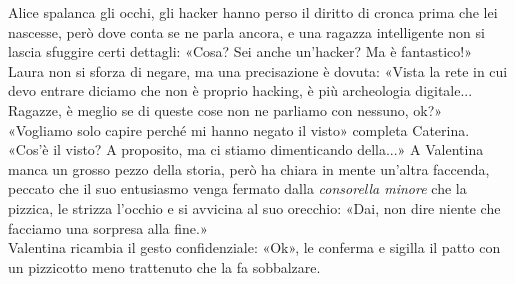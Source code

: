 \par\medskip
Alice spalanca gli occhi, gli hacker hanno perso il diritto di cronca prima che lei nascesse, per\`o dove conta se ne parla ancora, e una ragazza intelligente non si lascia sfuggire certi dettagli: «Cosa? Sei anche un'hacker? Ma \`e fantastico!»\\
Laura non si sforza di negare, ma una precisazione \`e dovuta:
«Vista la rete in cui devo entrare diciamo che non \`e proprio hacking, \`e pi\`u archeologia digitale... Ragazze, \`e meglio se di queste cose non ne parliamo con nessuno, ok?»\\
«Vogliamo solo capire perch\'e mi hanno negato il visto» completa Caterina.\\
«Cos’\`e il visto? A proposito, ma ci stiamo dimenticando della...» A Valentina manca un grosso pezzo della storia, per\`o ha chiara in mente un'altra faccenda, peccato che il suo entusiasmo venga fermato dalla \textit{consorella minore} che la pizzica, le strizza l’occhio e si avvicina al suo orecchio: «Dai, non dire niente che facciamo una sorpresa alla fine.»\\
Valentina ricambia il gesto confidenziale: «Ok», le conferma e sigilla il patto con un pizzicotto meno trattenuto che la fa sobbalzare.

